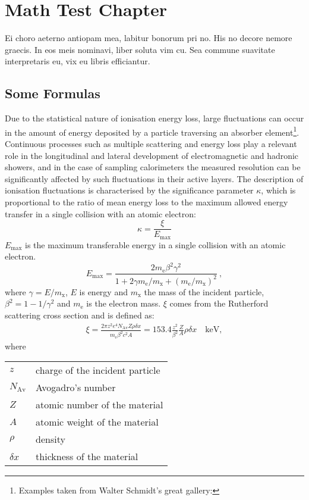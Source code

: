 \chapter{Math Test Chapter}\label{ch:mathtest} %
Ei choro aeterno antiopam mea, labitur bonorum pri no. His no decore
nemore graecis. In eos meis nominavi, liber soluta vim cu. Sea commune
suavitate interpretaris eu, vix eu libris efficiantur.

\section{Some Formulas}
Due to the statistical nature of ionisation energy loss, large
fluctuations can occur in the amount of energy deposited by a particle
traversing an absorber element\footnote{Examples taken from Walter
Schmidt's great gallery: }.  Continuous processes
such as multiple
scattering and energy loss play a relevant role in the longitudinal
and lateral development of electromagnetic and hadronic
showers, and in the case of sampling calorimeters the
measured resolution can be significantly affected by such fluctuations
in their active layers.  The description of ionisation fluctuations is
characterised by the significance parameter $\kappa$, which is
proportional to the ratio of mean energy loss to the maximum allowed
energy transfer in a single collision with an atomic electron:
\[
\kappa =\frac{\xi}{E_{\mathrm{max}}} %
\]
$E_{\mathrm{max}}$ is the maximum transferable energy in a single
collision with
an atomic electron.
\[
E_{\mathrm{max}} =\frac{2 m_{\mathrm{e}} \beta^2\gamma^2 }{1 +
2\gamma m_{\mathrm{e}}/m_{\mathrm{x}} + \left ( m_{\mathrm{e}}
/m_{\mathrm{x}}\right)^2}\ ,
\]
where $\gamma = E/m_{\mathrm{x}}$, $E$ is energy and
$m_{\mathrm{x}}$ the mass of the incident particle,
$\beta^2 = 1 - 1/\gamma^2$ and $m_{\mathrm{e}}$ is the electron mass.
$\xi$ comes from the Rutherford scattering cross section
and is defined as:
\begin{eqnarray*} \xi  = \frac{2\pi z^2 e^4 N_{\mathrm{Av}} Z \rho
\delta x}{m_{\mathrm{e}} \beta^2 c^2 A} =  153.4 \frac{z^2}{\beta^2}
\frac{Z}{A}
  \rho \delta x \quad\mathrm{keV},
\end{eqnarray*}
where

\begin{tabular}{ll}
$z$          & charge of the incident particle \\
$N_{\mathrm{Av}}$     & Avogadro's number \\
$Z$          & atomic number of the material \\
$A$          & atomic weight of the material \\
$\rho$       & density \\
$ \delta x$  & thickness of the material \\
\end{tabular}

